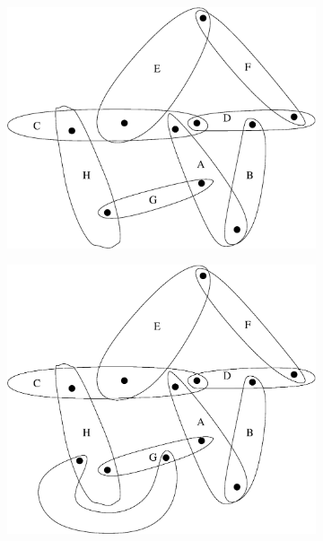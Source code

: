 \begin{figure}\centering
\begin{subfigure}{0.2\linewidth}\centering
    \includegraphics[width=\linewidth]{img/bodypin}
    \caption{}
\end{subfigure}
\begin{subfigure}{0.2\linewidth}\centering
    
    \caption{}
\end{subfigure}
\begin{subfigure}{0.3\linewidth}\centering\scriptsize
    
    \caption{}
\end{subfigure}
\begin{subfigure}{0.2\linewidth}\centering
    \includegraphics[width=\linewidth]{img/bodypin2}
    \caption{}
\end{subfigure}


\end{figure}
